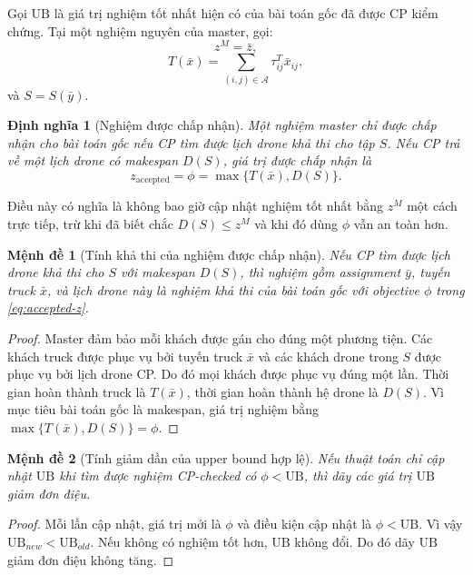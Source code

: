 \documentclass[12pt,a4paper]{article}
\newtheorem{definition}{Định nghĩa}
\newtheorem{proposition}{Mệnh đề}
\newcommand{\A}{\mathcal{A}}
\newcommand{\UB}{\mathrm{UB}}
\begin{document}
Gọi $\UB$ là giá trị nghiệm tốt nhất hiện có của bài toán gốc đã được CP kiểm chứng. Tại một nghiệm nguyên của master, gọi:
\[
    z^M=\bar z,
\]
\[
    T(\bar x)=\sum_{(i,j)\in\A}\tau^T_{ij}\bar x_{ij},
\]
và $S=S(\bar y)$.

\begin{definition}[Nghiệm được chấp nhận]
Một nghiệm master chỉ được chấp nhận cho bài toán gốc nếu CP tìm được lịch drone khả thi cho tập $S$. Nếu CP trả về một lịch drone có makespan $D(S)$, giá trị được chấp nhận là
\begin{equation}
    z_{\mathrm{accepted}}=\phi=\max\{T(\bar x),D(S)\}.
    \label{eq:accepted-z}
\end{equation}
\end{definition}

Điều này có nghĩa là không bao giờ cập nhật nghiệm tốt nhất bằng $z^M$ một cách trực tiếp, trừ khi đã biết chắc $D(S)\le z^M$ và khi đó dùng $\phi$ vẫn an toàn hơn.

\begin{proposition}[Tính khả thi của nghiệm được chấp nhận]
Nếu CP tìm được lịch drone khả thi cho $S$ với makespan $D(S)$, thì nghiệm gồm assignment $\bar y$, tuyến truck $\bar x$, và lịch drone này là nghiệm khả thi của bài toán gốc với objective $\phi$ trong \eqref{eq:accepted-z}.
\end{proposition}
\begin{proof}
Master đảm bảo mỗi khách được gán cho đúng một phương tiện. Các khách truck được phục vụ bởi tuyến truck $\bar x$ và các khách drone trong $S$ được phục vụ bởi lịch drone CP. Do đó mọi khách được phục vụ đúng một lần. Thời gian hoàn thành truck là $T(\bar x)$, thời gian hoàn thành hệ drone là $D(S)$. Vì mục tiêu bài toán gốc là makespan, giá trị nghiệm bằng $\max\{T(\bar x),D(S)\}=\phi$.
\end{proof}

\begin{proposition}[Tính giảm dần của upper bound hợp lệ]
Nếu thuật toán chỉ cập nhật $\UB$ khi tìm được nghiệm CP-checked có $\phi<\UB$, thì dãy các giá trị $\UB$ giảm đơn điệu.
\end{proposition}
\begin{proof}
Mỗi lần cập nhật, giá trị mới là $\phi$ và điều kiện cập nhật là $\phi<\UB$. Vì vậy $\UB_{new}<\UB_{old}$. Nếu không có nghiệm tốt hơn, $\UB$ không đổi. Do đó dãy $\UB$ giảm đơn điệu không tăng.
\end{proof}

\end{document}
